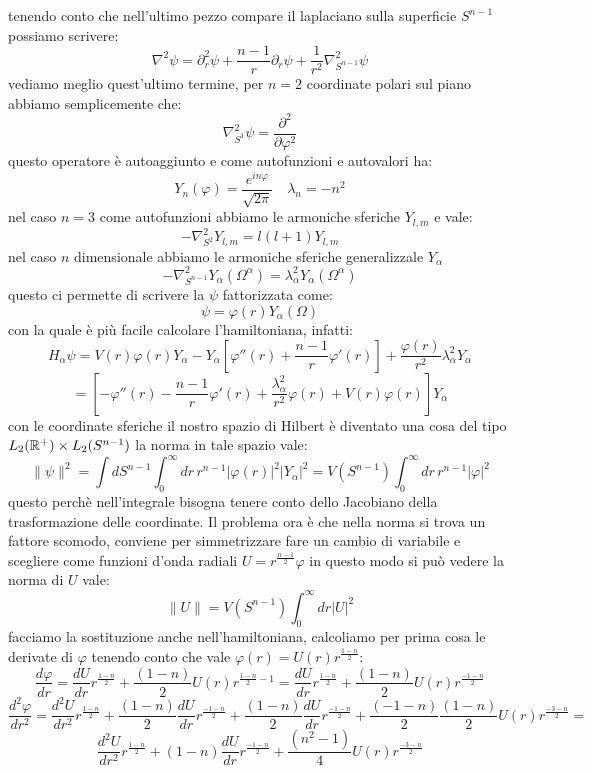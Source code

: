 tenendo conto che nell'ultimo pezzo compare il laplaciano sulla superficie $S^{n-1}$ possiamo scrivere:
\[\nabla^2\psi = \partial_r^2\psi + \frac{n-1}{r}\partial_r\psi + \frac{1}{r^2}\nabla_{S^{n-1}}^2\psi\]
vediamo meglio quest'ultimo termine, per $n=2$ coordinate polari sul piano abbiamo semplicemente che:
\[\nabla_{S^{1}}^2\psi =\frac{\partial^2}{\partial \varphi^2}\]
questo operatore è autoaggiunto e come autofunzioni e autovalori ha:
\[Y_{n}(\varphi) = \frac{e^{in\varphi}}{\sqrt{2\pi}}\quad \lambda_n = - n^2\]
nel caso $n=3$ come autofunzioni abbiamo le armoniche sferiche $Y_{l,m}$ e vale:
\[-\nabla^2_{S^2}Y_{l,m} = l(l+1)Y_{l,m}\]
nel caso $n$ dimensionale abbiamo le armoniche sferiche generalizzale $Y_{\alpha}$
\[-\nabla^2_{S^{n-1}}Y_{\alpha}(\Omega^\alpha) = \lambda^2_\alpha Y_\alpha(\Omega^\alpha)\]
questo ci permette di scrivere la $\psi$ fattorizzata come:
\[\psi = \varphi(r)Y_\alpha(\Omega)\]
con la quale è più facile calcolare l'hamiltoniana, infatti:
\[H_\alpha\psi = V(r)\varphi(r)Y_\alpha - Y_\alpha\left[\varphi''(r) + \frac{n-1}{r}\varphi'(r)\right] + \frac{\varphi(r)}{r^2}\lambda_\alpha^2Y_\alpha\]
\[ = \left[-\varphi''(r) - \frac{n-1}{r}\varphi'(r) + \frac{\lambda_\alpha^2}{r^2}\varphi(r)+V(r)\varphi(r)  \right]Y_\alpha\]
con le coordinate sferiche il nostro spazio di Hilbert è diventato una cosa del tipo $L_2(\mathbb{R}^+)\times L_2(S^{n-1})$ la norma in tale spazio vale:
\[\|\psi\|^2 = \int dS^{n-1}\int_0^\infty dr\,r^{n-1}|\varphi(r)|^2|Y_\alpha|^2 = V(S^{n-1})\int_0^\infty dr\,r^{n-1} |\varphi|^2\]
questo perchè nell'integrale bisogna tenere conto dello Jacobiano della trasformazione delle coordinate. Il problema ora è che nella norma si trova un fattore scomodo, conviene per simmetrizzare fare un cambio di variabile e scegliere come funzioni d'onda radiali $U = r^{\frac{n-1}{2}}\varphi$ in questo modo si può vedere la norma di $U$ vale:
\[\|U\| =  V(S^{n-1})\int_0^\infty dr |U|^2\]
facciamo la sostituzione anche nell'hamiltoniana, calcoliamo per prima cosa le derivate di $\varphi$ tenendo conto che vale $\varphi(r) = U(r)r^{\frac{1-n}{2}}$:
\[\frac{d\varphi}{dr} = \frac{dU}{dr}r^{\frac{1-n}{2}} + \frac{(1-n)}{2}U(r)r^{\frac{1-n}{2}-1} = \frac{dU}{dr}r^{\frac{1-n}{2}} + \frac{(1-n)}{2}U(r)r^{\frac{-1-n}{2}}  \]
\[\frac{d^2\varphi}{dr^2} = \frac{d^2U}{dr^2}r^{\frac{1-n}{2}} +  \frac{(1-n)}{2}\frac{dU}{dr}r^{\frac{-1-n}{2}} + \frac{(1-n)}{2}\frac{dU}{dr}r^{\frac{-1-n}{2}} + \frac{(-1-n)}{2}\frac{(1-n)}{2}U(r)r^{\frac{-3-n}{2}}=\]
\[\frac{d^2U}{dr^2}r^{\frac{1-n}{2}} + (1-n)\frac{dU}{dr}r^{\frac{-1-n}{2}} + \frac{(n^2-1)}{4}U(r)r^{\frac{-3-n}{2}}\]
